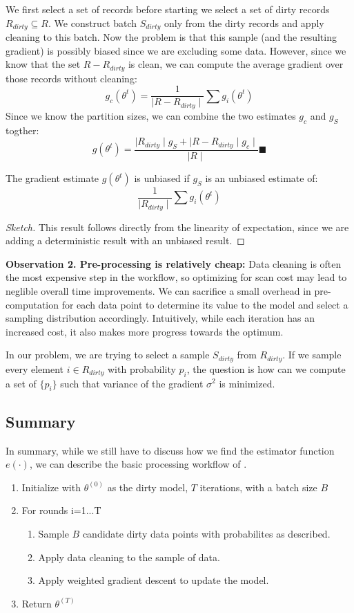 We first select a set of records before starting we select a set of dirty records $R_{dirty} \subseteq R$. 
We construct batch $S_{dirty}$ only from the dirty records and apply cleaning to this batch.
Now the problem is that this sample (and the resulting gradient) is possibly biased since we are excluding some data.
However, since we know that the set $R - R_{dirty}$ is clean, we can compute the average gradient over those records without cleaning:
\[
g_c(\theta^{t}) = \frac{1}{\mid R - R_{dirty} \mid} \sum g_i(\theta^{t})
\]
Since we know the partition sizes, we can combine the two estimates $g_c$ and $g_S$ togther:
\[
g(\theta^{t}) = \frac{\mid R_{dirty} \mid g_S + \mid R - R_{dirty} \mid g_c \mid }{\mid R \mid} \blacksquare
\]

\begin{lemma}
The gradient estimate $g(\theta^{t})$ is unbiased if $g_S$ is an unbiased estimate of:
\[
\frac{1}{\mid R_{dirty} \mid} \sum g_i(\theta^{t})
\]
\end{lemma}
\begin{proof}[Sketch]
This result follows directly from the linearity of expectation, since we are adding a deterministic result with an unbiased result.
\end{proof}

\vspace{0.5em}

\noindent\textbf{Observation 2. Pre-processing is relatively cheap: }
Data cleaning is often the most expensive step in the workflow, so optimizing for scan cost may lead to neglible overall time improvements.
We can sacrifice a small overhead in pre-computation for each data point to determine its value to the model and select a sampling distribution accordingly.
Intuitively, while each iteration has an increased cost, it also makes more progress towards the optimum.

In our problem, we are trying to select a sample $S_{dirty}$ from $R_{dirty}$.
If we sample every element $i \in R_{dirty}$ with probability $p_i$, the question is
how can we compute a set of $\{p_i\}$ such that variance of the gradient $\sigma^2$ is minimized. 


\subsection{Summary}
In summary, while we still have to discuss how we find the estimator function $e(\cdot)$, we can describe the basic processing workflow of \sys.
\begin{enumerate}[noitemsep]
\item Initialize with $\theta^{(0)}$ as the dirty model, $T$ iterations, with a batch size $B$
\item For rounds i=1...T
\begin{enumerate}
	\item Sample $B$ candidate dirty data points with probabilites as described.
	\item Apply data cleaning to the sample of data.
	\item Apply weighted gradient descent to update the model.
\end{enumerate}
\item Return $\theta^{(T)}$
\end{enumerate} 